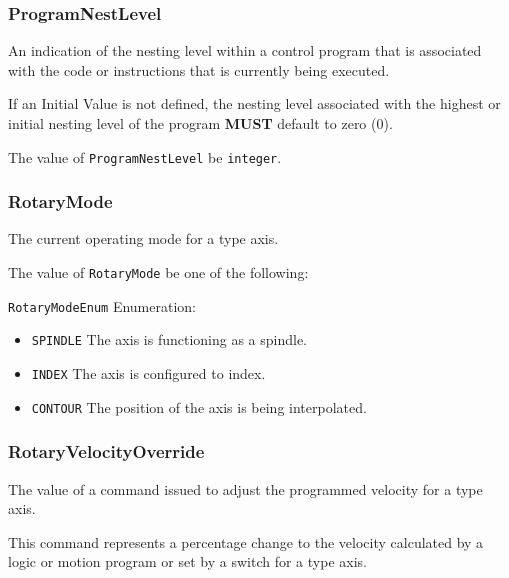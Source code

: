 \subsubsection{ProgramNestLevel}
\label{sec:ProgramNestLevel}



An indication of the nesting level within a control program that is associated with the code or instructions that is currently being executed.
  
If an Initial Value is not defined, the nesting level associated with the highest or initial nesting level of the program \textbf{MUST} default to zero (0).



The value of \texttt{ProgramNestLevel} \MUST be \texttt{integer}.



\subsubsection{RotaryMode}
\label{sec:RotaryMode}



The current operating mode for a  type axis.


The value of \texttt{RotaryMode} \MUST be one of the following: 


\texttt{RotaryModeEnum} Enumeration:

\begin{itemize}
\item \texttt{SPINDLE} \newline The axis is functioning as a spindle. 
\item \texttt{INDEX} \newline The axis is configured to index. 
\item \texttt{CONTOUR} \newline The position of the axis is being interpolated. 
\end{itemize}



\subsubsection{RotaryVelocityOverride}
\label{sec:RotaryVelocityOverride}



The value of a command issued to adjust the programmed velocity for a  type axis.

This command represents a percentage change to the velocity calculated by a logic or motion program or set by a switch for a  type axis.


